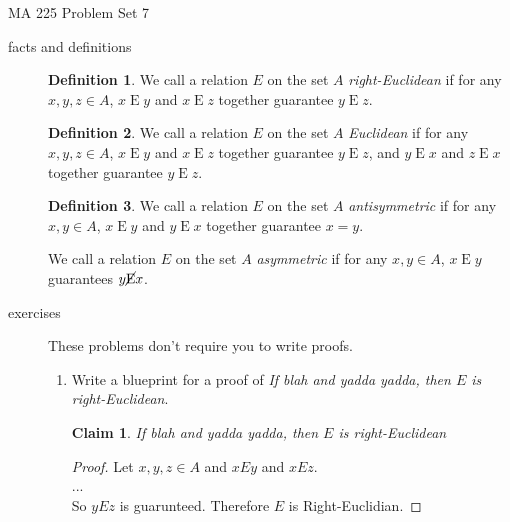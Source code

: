 \documentclass[11pt]{letter}
\newtheorem{claim}{Claim}
\theoremstyle{definition}
\newtheorem{definition}{Definition}
\begin{document}
\pagestyle{empty}

{\Large MA 225 Problem Set 7}\\

\begin{description}

\item[facts and definitions]
	
	\begin{definition} 
		We call a relation $E$ on the set $A$ {\em right-Euclidean} if for any $x,y,z\in A$, $x \operatorname{E} y$ and $x\operatorname{E} z$ together guarantee $y\operatorname{E}z$.
	\end{definition}
	
	\begin{definition}
		We call a relation $E$ on the set $A$ {\em Euclidean} if for any $x,y,z\in A$, $x \operatorname{E} y$ and $x\operatorname{E} z$ together guarantee $y\operatorname{E}z$, and $y\operatorname{E}x$ and $z\operatorname{E} x$ together guarantee $y\operatorname{E} z$. 
	\end{definition}
	
	\begin{definition}
	  We call a relation $E$ on the set $A$ {\em antisymmetric} if for any $x,y\in A$, $x\operatorname{E} y$ and $y\operatorname{E} x$ together guarantee $x=y$.
          
		
		We call a relation $E$ on the set $A$ {\em asymmetric} if for any $x,y\in A$, $x\operatorname{E}y$ guarantees $y\cancel{\operatorname{E}}x$.\end{definition}\bigskip

	
\item[exercises] These problems don't require you to write proofs.
	\begin{enumerate}
	\item Write a blueprint for a proof of {\em If blah and yadda yadda, then $E$ is right-Euclidean}.
          \begin{claim}
            If blah and yadda yadda, then $E$ is right-Euclidean
          \end{claim}
          \begin{proof}
            Let $x,y,z\in A$ and $xEy$ and $xEz$.\\
            ...\\
            So $yEz$ is guarunteed. Therefore $E$ is Right-Euclidian.
          \end{proof}
          

\end{enumerate}
\end{description}
\end{document}
